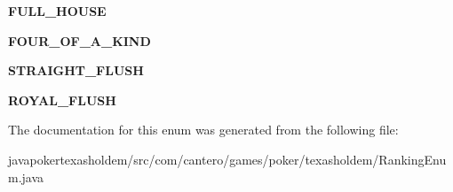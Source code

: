 \begin{DoxyCompactItemize}
\item 
\hypertarget{enumcom_1_1cantero_1_1games_1_1poker_1_1texasholdem_1_1_ranking_enum_a7c4e38b10e17a97966d812cb357bfe26}{}{\bfseries F\+U\+L\+L\+\_\+\+H\+O\+U\+S\+E}\label{enumcom_1_1cantero_1_1games_1_1poker_1_1texasholdem_1_1_ranking_enum_a7c4e38b10e17a97966d812cb357bfe26}

\item 
\hypertarget{enumcom_1_1cantero_1_1games_1_1poker_1_1texasholdem_1_1_ranking_enum_a9e32c2b4c5c8d9e15dde63cd43e8bbde}{}{\bfseries F\+O\+U\+R\+\_\+\+O\+F\+\_\+\+A\+\_\+\+K\+I\+N\+D}\label{enumcom_1_1cantero_1_1games_1_1poker_1_1texasholdem_1_1_ranking_enum_a9e32c2b4c5c8d9e15dde63cd43e8bbde}

\item 
\hypertarget{enumcom_1_1cantero_1_1games_1_1poker_1_1texasholdem_1_1_ranking_enum_a178641fdaa8580f3ed0a84622ef82d55}{}{\bfseries S\+T\+R\+A\+I\+G\+H\+T\+\_\+\+F\+L\+U\+S\+H}\label{enumcom_1_1cantero_1_1games_1_1poker_1_1texasholdem_1_1_ranking_enum_a178641fdaa8580f3ed0a84622ef82d55}

\item 
\hypertarget{enumcom_1_1cantero_1_1games_1_1poker_1_1texasholdem_1_1_ranking_enum_a17ee098e732f1f478ac7d88aaa9904e0}{}{\bfseries R\+O\+Y\+A\+L\+\_\+\+F\+L\+U\+S\+H}\label{enumcom_1_1cantero_1_1games_1_1poker_1_1texasholdem_1_1_ranking_enum_a17ee098e732f1f478ac7d88aaa9904e0}

\end{DoxyCompactItemize}


The documentation for this enum was generated from the following file\+:\begin{DoxyCompactItemize}
\item 
javapokertexasholdem/src/com/cantero/games/poker/texasholdem/Ranking\+Enum.\+java\end{DoxyCompactItemize}

